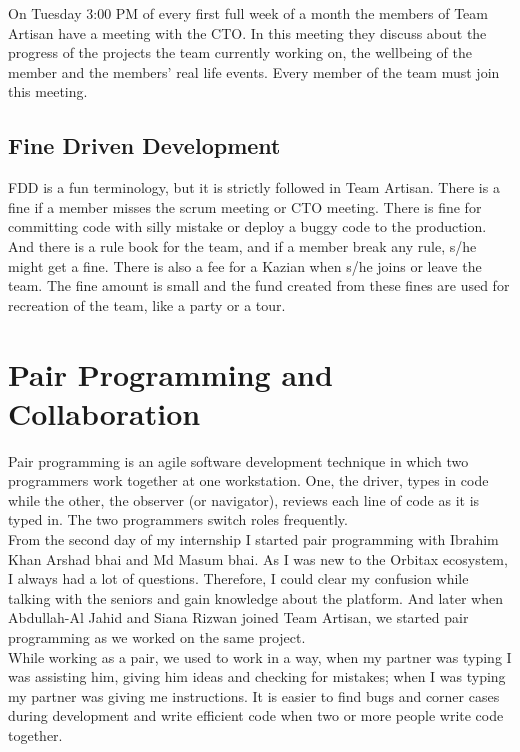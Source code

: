 On Tuesday 3:00 PM of every first full week of a month the members of Team Artisan have a meeting with the CTO.
In this meeting they discuss about the progress of the projects the team currently working on, the wellbeing of the member and the members' real life events.
Every member of the team must join this meeting.

\subsection{Fine Driven Development}

FDD is a fun terminology, but it is strictly followed in Team Artisan.
There is a fine if a member misses the scrum meeting or CTO meeting.
There is fine for committing code with silly mistake or deploy a buggy code to the production.
And there is a rule book for the team, and if a member break any rule, s/he might get a fine.
There is also a fee for a Kazian when s/he joins or leave the team.
The fine amount is small and the fund created from these fines are used for recreation of the team, like a party or a tour.

\section{Pair Programming and Collaboration}

Pair programming is an agile software development technique in which two programmers work together at one workstation. One, the driver, types in code
while the other, the observer (or navigator), reviews each line of code as it is typed in. The two programmers switch roles frequently.\\

From the second day of my internship I started pair programming with Ibrahim Khan Arshad bhai and Md Masum bhai.
As I was new to the Orbitax ecosystem, I always had a lot of questions.
Therefore, I could clear my confusion while talking with the seniors and gain knowledge about the platform.
And later when Abdullah-Al Jahid and Siana Rizwan joined Team Artisan, we started pair programming as we worked on the same project.\\

While working as a pair, we used to work in a way, when my partner was typing I was assisting him, giving him ideas and checking for mistakes; when I was typing my partner was giving me instructions.
It is easier to find bugs and corner cases during development and write efficient code when two or more people write code together.\\

